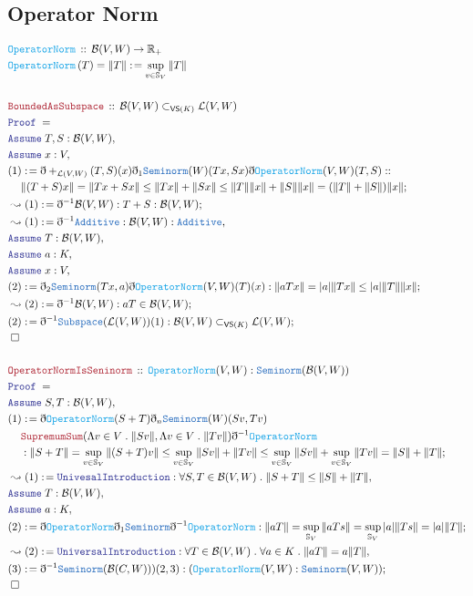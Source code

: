\documentclass[12pt]{scrartcl}
\newcommand{\TYPE}[1]{\textcolor{NavyBlue}{\mathtt{#1}}}
\newcommand{\FUNC}[1]{\textcolor{Cerulean}{\mathtt{#1}}}
\newcommand{\LOGIC}[1]{\textcolor{Blue}{\mathtt{#1}}}
\newcommand{\THM}[1]{\textcolor{Maroon}{\mathtt{#1}}}
\renewcommand{\.}{\; . \;}
\newcommand{\de}{: \kern 0.1pc =}
\newcommand{\Act}[1]{\left( #1 \right)}
\newcommand{\Theorem}[2]{& \THM{#1} \, :: \, #2 \\ & \Proof = \\ }
\newcommand{\DeclareFunc}[2]{& \FUNC{#1} \, :: \, #2 \\}
\newcommand{\DefineNamedFunc}[4]{&  \FUNC{#1}\Act{#2} = #3 \de #4 \\}
\newcommand{\NewLine}{\\ & \kern 1pc}
\newcommand{\Page}[1]{\begin{align*} #1 \end{align*} \newpage   }
\newcommand{ \bd }{ \ByDef }
\newcommand{\Reals}{\mathbb{R} }
\newcommand{\Conclude}[3]{& #1 \de #2 : #3; \\}
\newcommand{\Derive}[3]{& \leadsto #1 \de #2 : #3, \\}
\newcommand{\DeriveConclude}[3]{& \leadsto #1 \de #2 : #3 ; \\}
\newcommand{\A}{\LOGIC{Assume} \;}
\newcommand{\Assume}[2]{& \A #1 : #2, \\}
\newcommand{\QED}{\; \square}
\newcommand{\EndProof}{& \QED \\}
\newcommand{\ByDef}{\eth}
\newcommand{\Proof}{\LOGIC{Proof} \; }
\newcommand{\B}{\mathcal{B}}
\begin{document}
\subsection{Operator Norm}
\Page{
  \DeclareFunc{OperatorNorm}{ \B(V,W) \to \Reals_+ }
  \DefineNamedFunc{OperatorNorm}{T}{\| T \|}{ \sup_{ v \in \mathbb{S}_V }  \| T \| }
  \\ 
  \Theorem{BoundedAsSubspace}{ \B(V,W) \subset_{\mathsf{VS}(K)} \mathcal{L}(V,W)}
  \Assume{T,S}{\B(V,W)}
  \Assume{x}{V}
  \Conclude{ (1) }{ \bd+_{\mathcal{L}(V,W)}(T,S)(x)\bd_1 \TYPE{Seminorm}  
  (W)(Tx,Sx)\bd \FUNC{OperatorNorm}(V,W)(T,S)  
  }{ : \NewLine \| (T + S)x \| = \| Tx + Sx\| \le \| Tx \| + \| S x \| \le 
  \|T\|\|x\| + \|S\|\|x\| = (\|T\| + \|S\|)\| x \|}
  \DeriveConclude{(1)}{\bd^{-1} \B(V,W)}{T + S : \B(V,W)}
  \Derive{(1)}{ \bd^{-1}\TYPE{Additive}}{ \B(V,W) : \TYPE{Additive}}
  \Assume{T}{\B(V,W)}
  \Assume{a}{K}
  \Assume{x}{V}
  \Conclude{(2)}{ \bd_2\TYPE{Seminorm}(Tx,a)\bd\FUNC{OperatorNorm}(V,W)(T)(x)}
  {  \| aTx \| = |a|\|Tx\| \le |a|\|T\|\|x\|  }
  \DeriveConclude{(2)}{ \bd^{-1}\B(V,W)}{ aT \in \B(V,W) }
  \Conclude{(2)}{\bd^{-1}\TYPE{Subspace}(\mathcal{L}(V,W))(1)}{ \B(V,W) \subset_{\mathsf{VS}(K)} 
  \mathcal{L}(V,W)   }
  \EndProof
  \\
  \Theorem{OperatorNormIsSeninorm}{ \FUNC{OperatorNorm}(V,W) : \TYPE{Seminorm}(\B(V,W)) }
  \Assume{S,T}{ \B(V,W) } 
  \Conclude{(1)}{ \bd \FUNC{OperatorNorm}(S + T) 
      \bd_n \TYPE{Seminorm}(W)(Sv,Tv)
       \NewLine      
       \THM{SupremumSum}( \Lambda v \in V \. \|Sv\|, 
       \Lambda v \in V \.  \| Tv \| ) \bd^{-1}\FUNC{OperatorNorm} 
      \NewLine         
   }{ \| S + T \| =  \sup_{v \in \mathbb{S}_V} \| (S + T)v \| \le
   \sup_{v \in \mathbb{S}_V} \| Sv \| +  \| Tv \| \le
   \sup_{v \in \mathbb{S}_V} \| Sv \| + \sup_{v \in \mathbb{S}_V} \| Tv \| = 
   \| S \| + \| T \|  
    }
  \Derive{(1)}{ \LOGIC{UnivesalIntroduction}}{ \forall S, T \in \B(V,W) \.  \| S + T \| \le \|S \| + \| T \|  }
  \Assume{T}{\B(V,W)}
  \Assume{a}{K}
  \Conclude{(2)}{ \bd \FUNC{OperatorNorm} \bd_1 \TYPE{Seminorm}\bd^{-1} \FUNC{OperatorNorm} }
  {  \| aT \| = \sup_{\mathbb{S}_V} \| aTs \| = 
      \sup_{\mathbb{S}_V}  |a |  \| Ts \|
      =  |a| \| T  \|
     }
   \Derive{(2)}{  \LOGIC{UniversalIntroduction} }{\forall T \in \B(V,W) \. \forall 
     a \in K \.  \| aT \| = a \| T \|   
    }
  \Conclude{ (3) }{ \bd^{-1}\TYPE{Seminorm}(\B(C,W)))(2, 3) }{ 
  (\FUNC{OperatorNorm}(V,W) : \TYPE{Seminorm}(V,W)  )
   }
  \EndProof
 }
\end{document}
